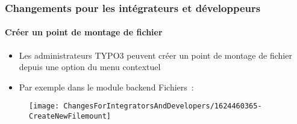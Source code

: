 %

\begin{frame}[fragile]
	\frametitle{Changements pour les intégrateurs et développeurs}
	\framesubtitle{Créer un point de montage de fichier}


	\begin{itemize}
		\item Les administrateurs TYPO3 peuvent créer un point de montage de fichier depuis
			une option du menu contextuel
		\item Par exemple dans le module backend Fichiers~:
	\end{itemize}

	\begin{figure}
		\texttt{[image: ChangesForIntegratorsAndDevelopers/1624460365-CreateNewFilemount]}
	\end{figure}

\end{frame}

